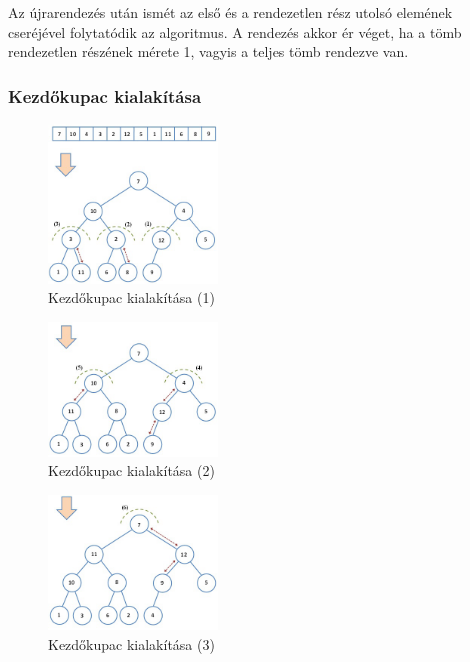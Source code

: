 \documentclass[12pt,margin=0px]{article}
\begin{document}
    \noindent Az újrarendezés után ismét az első és a rendezetlen rész utolsó elemének cseréjével folytatódik az algoritmus. A rendezés akkor ér véget, ha a tömb rendezetlen részének mérete 1, vagyis a teljes tömb rendezve van.

    \subsubsection*{Kezdőkupac kialakítása}
	
	\begin{figure}[H]
		\centering
		\includegraphics[width=0.4\textwidth]{img/heap_sort_createheap1.png}
		\caption{Kezdőkupac kialakítása (1)}
        \label{fig:heap_sort_createheap1}
	\end{figure}

	\begin{figure}[H]
		\centering
		\includegraphics[width=0.4\textwidth]{img/heap_sort_createheap2.png}
		\caption{Kezdőkupac kialakítása (2)}
        \label{fig:heap_sort_createheap2}
	\end{figure}

	\begin{figure}[H]
		\centering
		\includegraphics[width=0.4\textwidth]{img/heap_sort_createheap3.png}
		\caption{Kezdőkupac kialakítása (3)}
        \label{fig:heap_sort_createheap3}
	\end{figure}
\end{document}
